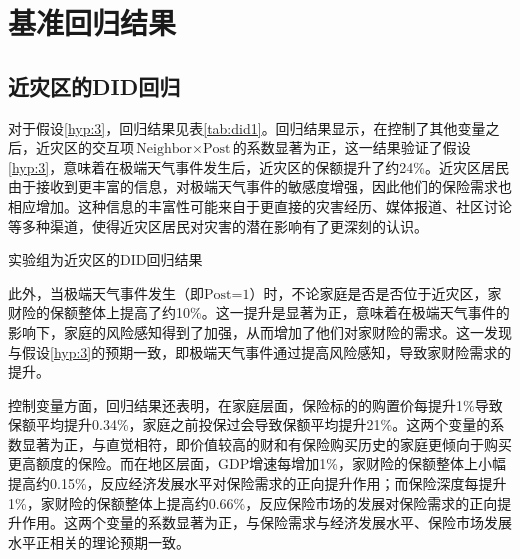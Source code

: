 \section{基准回归结果}

%     

\subsection{近灾区的DID回归}
对于假设\ref{hyp:3}，回归结果见表\ref{tab:did1}。回归结果显示，在控制了其他变量之后，近灾区的交互项$\text{Neighbor}\times \text{Post}$的系数显著为正，这一结果验证了假设\ref{hyp:3}，意味着在极端天气事件发生后，近灾区的保额提升了约24\%。近灾区居民由于接收到更丰富的信息，对极端天气事件的敏感度增强，因此他们的保险需求也相应增加。这种信息的丰富性可能来自于更直接的灾害经历、媒体报道、社区讨论等多种渠道，使得近灾区居民对灾害的潜在影响有了更深刻的认识。
\begin{table}[H]
    \centering
    \caption{实验组为近灾区的DID回归结果}\label{tab:did1}
    
\end{table}

此外，当极端天气事件发生（即$\text{Post=1}$）时，不论家庭是否是否位于近灾区，家财险的保额整体上提高了约10\%。这一提升是显著为正，意味着在极端天气事件的影响下，家庭的风险感知得到了加强，从而增加了他们对家财险的需求。这一发现与假设\ref{hyp:3}的预期一致，即极端天气事件通过提高风险感知，导致家财险需求的提升。

控制变量方面，回归结果还表明，在家庭层面，保险标的的购置价每提升1\%导致保额平均提升0.34\%，家庭之前投保过会导致保额平均提升21\%。这两个变量的系数显著为正，与直觉相符，即价值较高的财和有保险购买历史的家庭更倾向于购买更高额度的保险。而在地区层面，GDP增速每增加1\%，家财险的保额整体上小幅提高约0.15\%，反应经济发展水平对保险需求的正向提升作用\citep{JJYJ200401002,arena2008does}；而保险深度每提升1\%，家财险的保额整体上提高约0.66\%，反应保险市场的发展对保险需求的正向提升作用\citep{JRYJ200706018}。这两个变量的系数显著为正，与保险需求与经济发展水平、保险市场发展水平正相关的理论预期一致。


